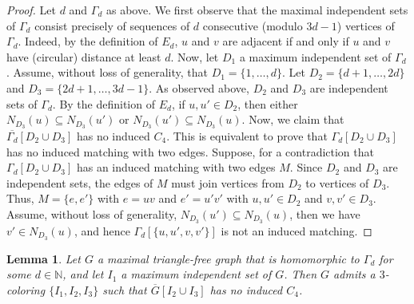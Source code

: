 \documentclass[a4paper,12pt]{article}
\newtheorem{lemma}[theorem]{Lemma}
\begin{document}
\begin{proof}
	Let \(d\) and \(\Gamma_d\) as above.
	We first observe that the maximal independent sets of \(\Gamma_d\)
	consist precisely of sequences of \(d\) consecutive (modulo \(3d-1\)) vertices of \(\Gamma_d\).
	Indeed,	by the definition of \(E_d\), \(u\) and \(v\) are adjacent 
	if and only if \(u\) and \(v\) have (circular) distance at least \(d\).
	Now, let \(D_1\) a maximum independent set of \(\Gamma_d\).
	Assume, without loss of generality, that \(D_1 = \{1,\ldots,d\}\).
	Let \(D_2 = \{d+1,\ldots,2d\}\) and \(D_3 = \{2d+1,\ldots, 3d-1\}\).
	As observed above, \(D_2\) and \(D_3\) are independent sets of \(\Gamma_d\).
	By the definition of \(E_d\), if \(u,u'\in D_2\),
	then either \(N_{D_3}(u) \subseteq N_{D_3}(u')\) or \(N_{D_3}(u') \subseteq N_{D_3}(u)\).
	Now, we claim that \(\overline{\Gamma_d}[D_2\cup D_3]\) has no induced \(C_4\).
	This is equivalent to prove that \(\Gamma_d[D_2\cup D_3]\) has no induced matching with two edges.
	Suppose, for a contradiction that \(\Gamma_d[D_2\cup D_3]\) has an induced matching with two edges \(M\).
	Since \(D_2\) and \(D_3\) are independent sets, the edges of \(M\) must join vertices from \(D_2\) to vertices of \(D_3\).
	Thus, \(M = \{e,e'\}\) with \(e = uv\) and \(e' = u'v'\) with \(u,u' \in D_2\) and \(v,v'\in D_3\).
	Assume, without loss of generality, \(N_{D_3}(u') \subseteq N_{D_3}(u)\),
	then we have \(v' \in N_{D_3}(u)\), and hence \(\Gamma_d[\{u,u',v,v'\}]\) is not an induced matching.
\end{proof}

\begin{lemma}\label{lemma:andrasfai_blowup_coloring}
	Let \(G\) a maximal triangle-free graph that is homomorphic to \(\Gamma_d\)
	for some \(d\in \mathbb{N}\),
	and let \(I_1\) a maximum independent set of \(G\).
	Then \(G\) admits a \(3\)-coloring \(\{I_1,I_2,I_3\}\)
	such that \(\overline{G}[I_2\cup I_3]\) has no induced \(C_4\).
\end{lemma}
\end{document}
